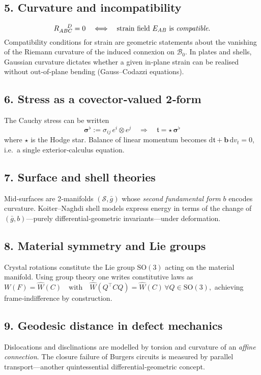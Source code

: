 \documentclass[12pt]{article}
\theoremstyle{definition} %
\theoremstyle{plain} %
\begin{document}
\subsection*{5.  Curvature and incompatibility}
\[
	R_{ABC}^{\;\;\;\;\;D} = 0 \quad\Longleftrightarrow\quad
	\text{strain field $E_{AB}$ is \emph{compatible}.}
\]
Compatibility conditions for strain are geometric statements about the
vanishing of the Riemann curvature of the induced connexion on
$\mathcal{B}_0$.  
In plates and shells, Gaussian curvature dictates whether a given
in‑plane strain can be realised without out‑of‑plane bending
(Gauss–Codazzi equations).

\subsection*{6.  Stress as a covector‑valued 2‑form}
The Cauchy stress can be written
\[
	\boldsymbol{\sigma}^\flat := \sigma_{ij}\,e^i\!\otimes\!e^j
	\quad\Longrightarrow\quad
	\mathfrak{t} = \star\,\boldsymbol{\sigma}^\flat
\]
where $\star$ is the Hodge star.  
Balance of linear momentum becomes
$\mathrm{d}\mathfrak{t} + \boldsymbol{b}\,\mathrm{d}v_t = 0$,
i.e.\ a single exterior‑calculus equation.

\subsection*{7.  Surface and shell theories}
Mid‑surfaces are 2‑manifolds $(\mathcal{S},\bar{g})$ whose
\emph{second fundamental form} $b$ encodes curvature.  
Koiter–Naghdi shell models express energy in terms of the change of
$(\bar{g},b)$—purely differential‑geometric invariants—under
deformation.

\subsection*{8.  Material symmetry and Lie groups}
Crystal rotations constitute the Lie group $\mathrm{SO}(3)$ acting on
the material manifold.  
Using group theory one writes constitutive laws as
\(
	W(F) = \widehat{W}(C) \quad\text{with}\quad
	\widehat{W}(Q^\top C Q)=\widehat{W}(C)\,\forall Q\in\mathrm{SO}(3),
\)
achieving frame‑indifference by construction.

\subsection*{9.  Geodesic distance in defect mechanics}
Dislocations and disclinations are modelled by torsion and curvature
of an \emph{affine connection}.  
The closure failure of Burgers circuits is measured by parallel
transport—another quintessential differential‑geometric concept.
\end{document}
